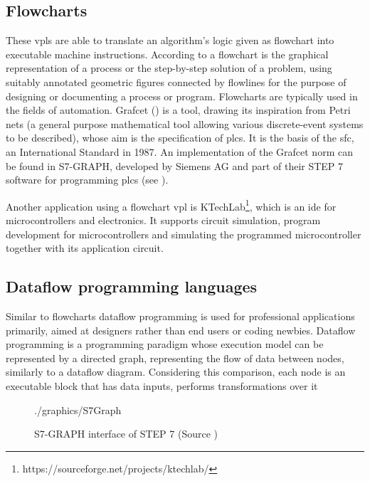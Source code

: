 \subsection{Flowcharts}
These \glspl{vpl} are able to translate an algorithm's logic given as flowchart into executable machine instructions. According to \cite{ISO2382} a flowchart is the graphical representation of a process or the step-by-step solution of a problem, using suitably annotated geometric figures connected by flowlines for the purpose of designing or documenting a process or program. Flowcharts are typically used in the fields of automation. Grafcet (\cite{Grafcet}) is a tool, drawing its inspiration from Petri nets (a general purpose mathematical tool allowing various discrete-event systems to be described), whose aim is the specification of \glspl{plc}. It is the basis of the \gls{sfc}, an International Standard in 1987. An implementation of the Grafcet norm can be found in S7-GRAPH, developed by Siemens AG and part of their STEP 7 software for programming \glspl{plc} (see ).

Another application using a flowchart \gls{vpl} is KTechLab\footnote{https://sourceforge.net/projects/ktechlab/}, which is an \gls{ide} for microcontrollers and electronics. It supports circuit simulation, program development for microcontrollers and simulating the programmed microcontroller together with its application circuit.

\subsection{Dataflow programming languages}
Similar to flowcharts dataflow programming is used for professional applications primarily, aimed at designers rather than end users or coding newbies. Dataflow programming is a programming paradigm whose execution model can be represented by a directed graph, representing the flow of data between nodes, similarly to a dataflow diagram. Considering this comparison, each node is an executable block that has data inputs, performs transformations over it

\begin{figure}[!h]
	\centering
	\begin{overpic}[width=0.65\linewidth]{./graphics/S7Graph}
	\end{overpic}
    \caption[S7-GRAPH interface of  STEP 7]%
        {S7-GRAPH interface of  STEP 7 (Source \footnotemark)}
	\label{fig:S7Graph}%
\end{figure}

